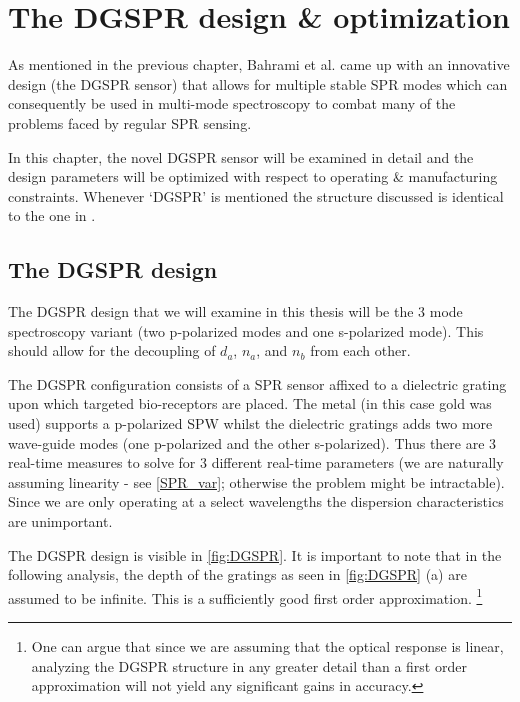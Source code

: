 

\chapter{The DGSPR design \& optimization}

As mentioned in the previous chapter, Bahrami et al. came up with an innovative design (the DGSPR sensor) that allows for multiple stable SPR modes which can consequently be used in multi-mode spectroscopy to combat many of the problems faced by regular SPR sensing. 

In this chapter, the novel DGSPR sensor will be examined in detail and the design parameters will be optimized with respect to operating \& manufacturing constraints. Whenever `DGSPR' is mentioned the structure discussed is identical to the one in \cite{farshid_ol}.

\section{The DGSPR design}

The DGSPR design that we will examine in this thesis will be the 3 mode spectroscopy variant (two p-polarized modes and one s-polarized mode). This should allow for the decoupling of $d_a$, $n_a$, and $n_b$ from each other. 

The DGSPR configuration consists of a SPR sensor affixed to a dielectric grating upon which targeted bio-receptors are placed. The metal (in this case gold was used) supports a p-polarized SPW whilst the dielectric gratings adds two more wave-guide modes (one p-polarized and the other s-polarized). Thus there are 3 real-time measures to solve for 3 different real-time parameters (we are naturally assuming linearity - see \autoref{SPR_var}; otherwise the problem might be intractable). Since we are only operating at a select wavelengths the dispersion characteristics are unimportant.

The DGSPR design is visible in  \autoref{fig:DGSPR}. It is important to note that in the following analysis, the depth of the gratings as seen in \autoref{fig:DGSPR} (a) are assumed to be infinite. This is a sufficiently good first order approximation. \footnote{One can argue that since we are assuming that the optical response is linear, analyzing the DGSPR structure in any greater detail than a first order approximation will not yield any significant gains in accuracy.}

